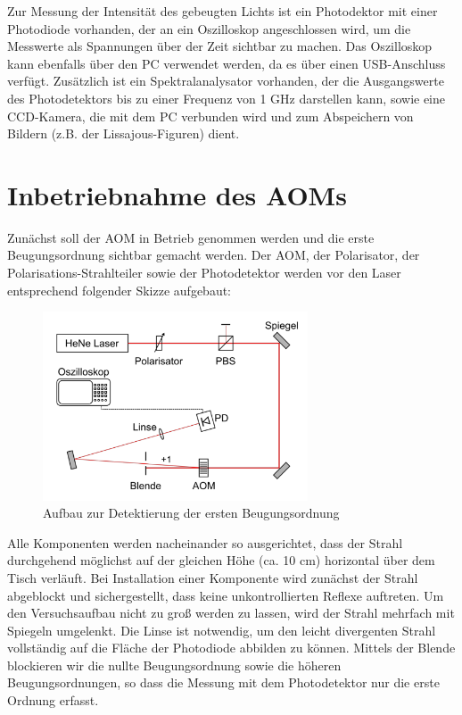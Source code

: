 \documentclass[bigchapter,colorback,accentcolor=tud4b,linedtoc,11pt]{tudreport}
\begin{document}
Zur Messung der Intensität des gebeugten Lichts ist ein Photodektor mit einer Photodiode vorhanden, der an ein Oszilloskop angeschlossen wird, um die Messwerte als Spannungen über der Zeit sichtbar zu machen. Das Oszilloskop kann ebenfalls über den PC verwendet werden, da es über einen USB-Anschluss verfügt. Zusätzlich ist ein Spektralanalysator vorhanden, der die Ausgangswerte des Photodetektors bis zu einer Frequenz von 1 GHz darstellen kann, sowie eine CCD-Kamera, die mit dem PC verbunden wird und zum Abspeichern von Bildern (z.B. der Lissajous-Figuren) dient.

\section{Inbetriebnahme des AOMs}

Zunächst soll der AOM in Betrieb genommen werden und die erste Beugungsordnung sichtbar gemacht werden. Der AOM, der Polarisator, der Polarisations-Strahlteiler sowie der Photodetektor werden vor den Laser entsprechend folgender Skizze aufgebaut:

\begin{figure}[h] 
  \centering
     \includegraphics[width=0.7\textwidth]{data/inbetriebnahme.jpg}
  \caption[Cap for listoffigures]{Aufbau zur Detektierung der ersten Beugungsordnung \cite{Anleitung}}
  \label{fig:Bild1}
\end{figure}

Alle Komponenten werden nacheinander so ausgerichtet, dass der Strahl durchgehend möglichst auf der gleichen Höhe (ca. 10 cm) horizontal über dem Tisch verläuft. Bei Installation einer Komponente wird zunächst der Strahl abgeblockt und sichergestellt, dass keine unkontrollierten Reflexe auftreten. Um den Versuchsaufbau nicht zu groß werden zu lassen, wird der Strahl mehrfach mit Spiegeln umgelenkt. Die Linse ist notwendig, um den leicht divergenten Strahl vollständig auf die Fläche der Photodiode abbilden zu können. Mittels der Blende blockieren wir die nullte Beugungsordnung sowie die höheren Beugungsordnungen, so dass die Messung mit dem Photodetektor nur die erste Ordnung erfasst.
\end{document}
